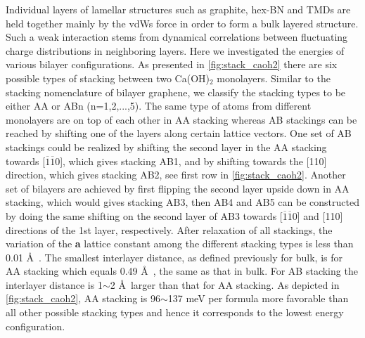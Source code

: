 Individual layers of lamellar structures such as graphite, hex-BN and TMDs 
are held together mainly by the vdWs force in order to form a bulk 
layered structure. Such a weak interaction stems from dynamical correlations 
between 
fluctuating charge distributions in neighboring layers. Here we 
investigated the energies of various bilayer configurations. As presented
in \autoref{fig:stack_caoh2} there are six possible types of stacking between two 
Ca(OH)$_2$ monolayers. Similar to the stacking nomenclature of bilayer graphene, 
we classify the stacking types to be either AA or ABn (n=1,2,...,5). The 
same type of atoms from different monolayers are on top of each other in AA 
stacking whereas AB stackings can be reached by shifting one of the layers along 
certain lattice vectors. One set of AB stackings could be realized by shifting 
the second layer in the AA stacking towards [$\overline{1}\overline{1}0$], 
which gives stacking AB1, and by shifting towards the [110] direction, which 
gives stacking AB2, see first row in \autoref{fig:stack_caoh2}. Another set of 
bilayers are achieved by first flipping the second layer upside down in AA 
stacking, which
would gives stacking AB3, then AB4 and AB5 can be constructed by doing the 
same shifting on the second layer of AB3 towards [$\overline{1}\overline{1}0$] 
and [110] directions of the 1st layer, respectively. After relaxation of all 
stackings, the variation of the \textbf{a} lattice constant among the different 
stacking types is less than 0.01 \AA~. The smallest interlayer
distance, as defined previously for bulk, is for AA stacking which equals
0.49 \AA~, the same as that in bulk. For AB
stacking the interlayer distance is 1$\sim$2 \AA ~larger than that for AA
stacking. As depicted in \autoref{fig:stack_caoh2}, AA stacking is 96$\sim$137 meV
per formula more favorable than all other possible stacking types and hence it
corresponds to the lowest energy configuration. 

